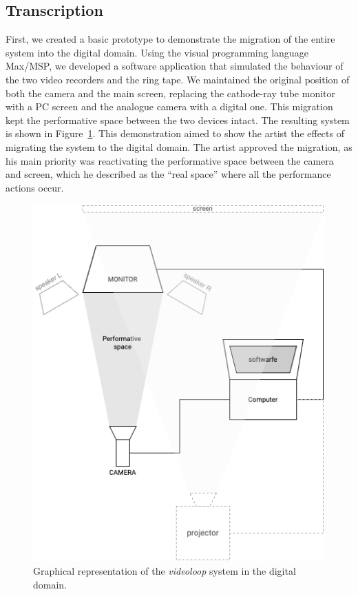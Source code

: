 \subsection*{Transcription}
First, we created a basic prototype to demonstrate the migration of the entire system into the digital domain. Using the visual programming language Max/MSP, we developed a software application that simulated the behaviour of the two video recorders and the ring tape. We maintained the original position of both the camera and the main screen, replacing the cathode-ray tube monitor with a PC screen and the analogue camera with a digital one. This migration kept the performative space between the two devices intact. The resulting system is shown in Figure~\ref{fig:aa-videoloop-graph02}. This demonstration aimed to show the artist the effects of migrating the system to the digital domain. The artist approved the migration, as his main priority was reactivating the performative space between the camera and screen, which he described as the ``real space'' \cite{fiordelmondo2023toward} where all the performance actions occur.
\begin{figure}[!h]
    \centering
    \includegraphics[width=0.8\linewidth]{chapters/appendix/a/image/grapha-videoloop02-2.png}
    \caption{Graphical representation of the \textit{videoloop} system in the digital domain.}
    \label{fig:aa-videoloop-graph02}
\end{figure}
